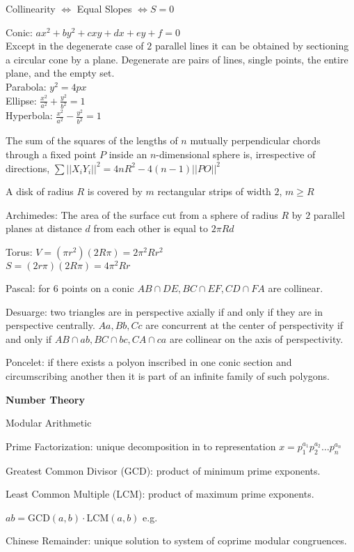 Collinearity $\iff$ Equal Slopes $\iff S=0$

Conic: $ax^2+by^2+cxy+dx+ey+f=0$ \\
Except in the degenerate case of $2$ parallel lines it can be obtained by sectioning a circular cone by a plane. Degenerate are pairs of lines, single points, the entire plane, and the empty set. \\
Parabola: $y^2=4px$ \\
Ellipse: $\frac{x^2}{a^2}+\frac{y^2}{b^2}=1$ \\
Hyperbola: $\frac{x^2}{a^2}-\frac{y^2}{b^2}=1$

The sum of the squares of the lengths of $n$ mutually perpendicular chords through a fixed point $P$ inside an $n$-dimensional sphere is, irrespective of directions, $\sum ||X_iY_i||^2 = 4nR^2 - 4(n-1)||PO||^2$

A disk of radius $R$ is covered by $m$ rectangular strips of width $2$, $m \ge R$

Archimedes: The area of the surface cut from a sphere of radius $R$ by $2$ parallel planes at distance $d$ from each other is equal to $2 \pi R d$

Torus: $V=(\pi r^2)(2R\pi)=2\pi^2 Rr^2$ \\
$S=(2r\pi)(2R\pi)=4\pi^2 Rr$

Pascal: for $6$ points on a conic $AB \cap DE,BC \cap EF,CD \cap FA$ are collinear.

Desuarge: two triangles are in perspective axially if and only if they are in perspective centrally. $Aa,Bb,Cc$ are concurrent at the center of perspectivity if and only if $AB \cap ab,BC \cap bc,CA \cap ca$ are collinear on the axis of perspectivity.

Poncelet: if there exists a polyon inscribed in one conic section and circumscribing another then it is part of an infinite family of such polygons.

\newpage

\textbf{Number Theory}

Modular Arithmetic

Prime Factorization: unique decomposition in to representation $x=p_1^{a_1} p_2^{a_2}\dots p_n^{a_n}$

Greatest Common Divisor (GCD): product of minimum prime exponents.

Least Common Multiple (LCM): product of maximum prime exponents.

$ab=\text{GCD}(a,b) \cdot \text{LCM}(a,b)$ e.g.

Chinese Remainder: unique solution to system of coprime modular congruences.

